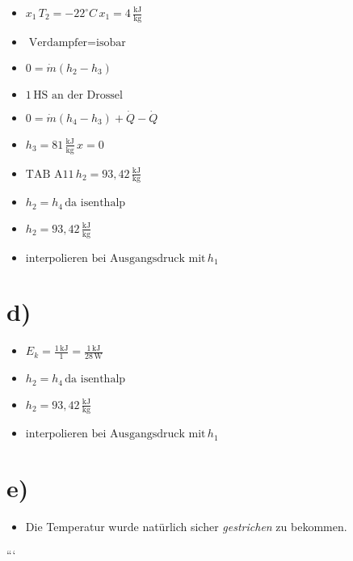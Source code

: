 \begin{itemize}
    \item \( x_1 \, T_2 = -22^\circ C \, x_1 = 4 \, \frac{\text{kJ}}{\text{kg}} \)
    \item \( \text{Verdampfer} = \text{isobar} \)
    \item \( 0 = \dot{m} (h_2 - h_3) \)
    \item \( 1 \, \text{HS an der Drossel} \)
    \item \( 0 = \dot{m} (h_4 - h_3) + \dot{Q} - \dot{Q} \)
    \item \( h_3 = 81 \, \frac{\text{kJ}}{\text{kg}} \, x = 0 \)
    \item \( \text{TAB A11} \, h_2 = 93,42 \, \frac{\text{kJ}}{\text{kg}} \)
    \item \( h_2 = h_4 \, \text{da isenthalp} \)
    \item \( h_2 = 93,42 \, \frac{\text{kJ}}{\text{kg}} \)
    \item \( \text{interpolieren bei Ausgangsdruck mit} \, h_1 \)
\end{itemize}

\section*{d)}

\begin{itemize}
    \item \( E_k = \frac{1 \, \text{kJ}}{1} = \frac{1 \, \text{kJ}}{28 \, \text{W}} \)
    \item \( h_2 = h_4 \, \text{da isenthalp} \)
    \item \( h_2 = 93,42 \, \frac{\text{kJ}}{\text{kg}} \)
    \item \( \text{interpolieren bei Ausgangsdruck mit} \, h_1 \)
\end{itemize}

\section*{e)}

\begin{itemize}
    \item Die Temperatur wurde natürlich sicher \textit{gestrichen} zu bekommen.
\end{itemize}

```